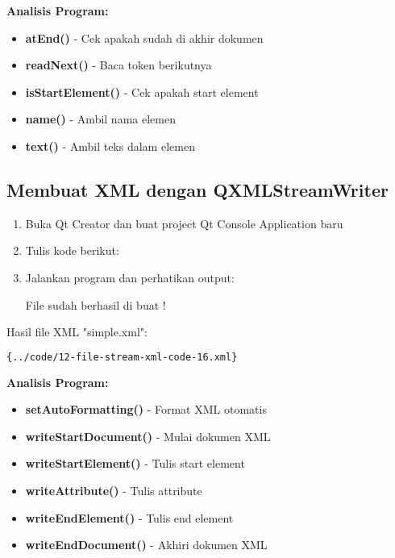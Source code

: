 \textbf{Analisis Program:}
\begin{itemize}
\item \textbf{atEnd()} - Cek apakah sudah di akhir dokumen
\item \textbf{readNext()} - Baca token berikutnya
\item \textbf{isStartElement()} - Cek apakah start element
\item \textbf{name()} - Ambil nama elemen
\item \textbf{text()} - Ambil teks dalam elemen
\end{itemize}

\subsection{Membuat XML dengan QXMLStreamWriter}

\begin{enumerate}
\item Buka Qt Creator dan buat project Qt Console Application baru
\item Tulis kode berikut:



\item Jalankan program dan perhatikan output:

\begin{lcverbatim}
File sudah berhasil di buat !
\end{lcverbatim}
\end{enumerate}

Hasil file XML "simple.xml":

\begin{lstlisting}[language=xml]{../code/12-file-stream-xml-code-16.xml}
\end{lstlisting}

\textbf{Analisis Program:}
\begin{itemize}
\item \textbf{setAutoFormatting()} - Format XML otomatis
\item \textbf{writeStartDocument()} - Mulai dokumen XML
\item \textbf{writeStartElement()} - Tulis start element
\item \textbf{writeAttribute()} - Tulis attribute
\item \textbf{writeEndElement()} - Tulis end element
\item \textbf{writeEndDocument()} - Akhiri dokumen XML
\end{itemize}

